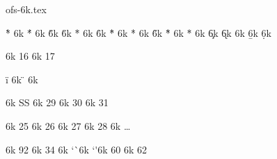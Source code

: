 

\protectreading ofs-6k.tex %

\accentdef  \` *    6k  { }                   %
\accentdef  \' *    6k  { }                   %
\accentdef  \v *    6k  { }                   %
\accentdef  \u *    6k  { }                   %
\accentdef  \= *    6k  { }                   %
\accentdef  \r *    6k  { }                   %
\accentdef  \^ *    6k  { }                   %
\accentdef  \. *    6k  { }                   %
\accentdef  \H *    6k  { }                  %
\accentdef  \~ *    6k  { }                  %
\accentdef  \" *    6k  { }                  %
\accentdef  \c *    6k  {}   %
\accentdef  \k *    6k  {}  %
\accentdef  \m *    6k  {\accentbelow {,}{.1ex}}        %
\accentdef  \b *    6k  {} %
\accentdef  \d *    6k  {}        %

\def\aa{\r a}
\def\AA{\r A}

\characterdef \dotlessi    6k  16 
\characterdef \dotlessj    6k  17
\let\i=\dotlessi  \let\j=\dotlessj

\accentdef \" i     6k  { \dotlessi}
\accentdef \" {\i}  6k  { \dotlessi}

\let\SS=\relax \let\AE=\relax \let\OE=\relax \let\O=\relax
\characterdef \SS   6k  {SS}
\characterdef \AE   6k  29
\characterdef \OE   6k  30
\characterdef \O    6k  31 

\let\ss=\relax \let\ae=\relax \let\oe=\relax \let\o=\relax
\characterdef \ss   6k  25
\characterdef \ae   6k  26
\characterdef \oe   6k  27
\characterdef \o    6k  28 
\characterdef \ellipsis 6k {\dots}

\let\elqq=\relax \let\erqq=\relax \let\elq=\relax \let\erq=\relax
\characterdef \elqq         6k  92
\characterdef \erqq         6k  34
\characterdef \elq          6k  `\`
\characterdef \erq          6k  `\'

\characterdef \exclamdown   6k  60
\characterdef \questiondown 6k  62

